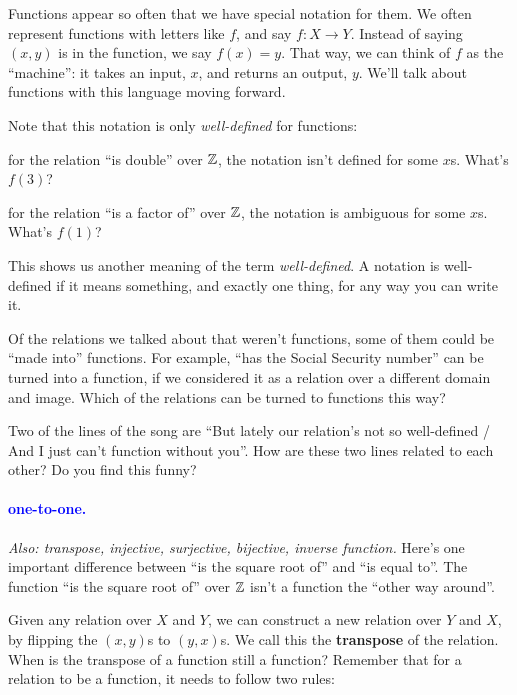 \documentclass[11pt,paper=letter]{scrartcl}
\renewcommand\wp[1]{\paragraph{\textcolor{Blue}{#1.}} \hspace{-1em}}
\newcommand\wl[1]{\label{w:#1}}
\newcommand\oww[1]{\textit{Also: #1.}}
\begin{document}
Functions appear so often that we have special notation for them. We often represent functions with letters like $f$, and say $f : X \to Y$. Instead of saying $(x, y)$ is in the function, we say $f(x) = y$. That way, we can think of $f$ as the ``machine'': it takes an input, $x$, and returns an output, $y$. We'll talk about functions with this language moving forward.

Note that this notation is only \textit{well-defined} for functions:

\begin{itemthin}
  \item for the relation ``is double'' over $\mathbb Z$, the notation isn't defined for some $x$s. What's $f(3)$?
  \item for the relation ``is a factor of'' over $\mathbb Z$, the notation is ambiguous for some $x$s. What's $f(1)$?
\end{itemthin}

This shows us another meaning of the term \textit{well-defined}. A notation is well-defined if it means something, and exactly one thing, for any way you can write it.

\begin{exrboxed}
  Of the relations we talked about that weren't functions, some of them could be ``made into'' functions. For example, ``has the Social Security number'' can be turned into a function, if we considered it as a relation over a different domain and image. Which of the relations can be turned to functions this way?
\end{exrboxed}

\begin{exrboxed}
  Two of the lines of the song are ``But lately our relation's not so well-defined / And I just can't function without you''. How are these two lines related to each other? Do you find this funny?
\end{exrboxed}

\wp{one-to-one}
\wl{one-to-one}
\oww{transpose, injective, surjective, bijective, inverse function}
Here's one important difference between ``is the square root of'' and ``is equal to''. The function ``is the square root of'' over $\mathbb Z$ isn't a function the ``other way around''.

Given any relation over $X$ and $Y$, we can construct a new relation over $Y$ and $X$, by flipping the $(x, y)$s to $(y, x)$s. We call this the \textbf{transpose} of the relation. When is the transpose of a function still a function? Remember that for a relation to be a function, it needs to follow two rules:
\end{document}
